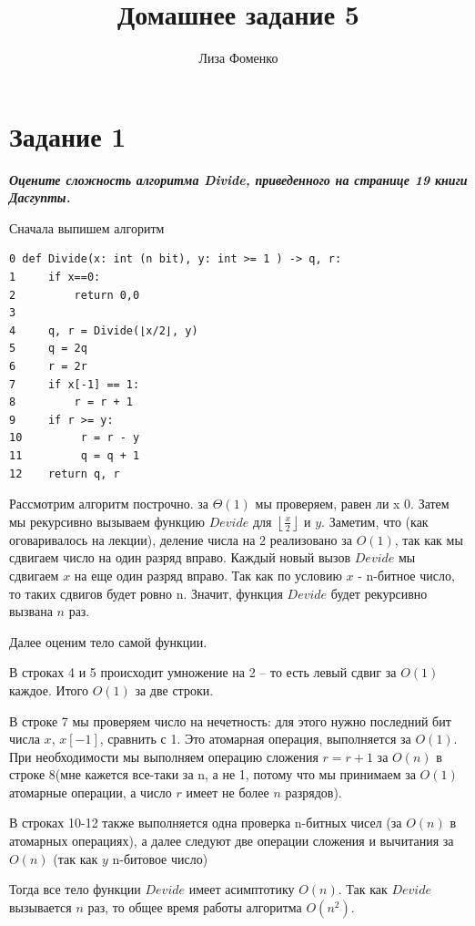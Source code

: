 \documentclass{article}
\title{Домашнее задание 5}
\author{Лиза Фоменко}
\date{}
\begin{document}
\maketitle



\section*{\textbf{Задание 1}} \textbf{\textit{Оцените сложность алгоритма Divide, приведенного на странице 19 книги Дасгупты.}}

Сначала выпишем алгоритм

\begin{verbatim}
0 def Divide(x: int (n bit), y: int >= 1 ) -> q, r:
1     if x==0: 
2         return 0,0
3 
4     q, r = Divide(⌊x/2⌋, y)
5     q = 2q
6     r = 2r
7     if x[-1] == 1: 
8         r = r + 1
9     if r >= y: 
10         r = r - y
11         q = q + 1
12    return q, r
\end{verbatim}

Рассмотрим алгоритм построчно. за $\Theta(1)$ мы проверяем, равен ли x 0. 
Затем мы рекурсивно вызываем функцию $Devide$ для $\left \lfloor{\frac{x}{2}}\right \rfloor $ и $y$. Заметим, что (как оговаривалось на лекции), деление числа на 2 реализовано за $O(1)$, так как мы сдвигаем число на один разряд вправо. Каждый новый вызов $Devide$ мы сдвигаем $x$ на еще один разряд вправо. Так как по условию $x$ - n-битное число, то таких сдвигов будет ровно n. Значит, функция $Devide$ будет рекурсивно вызвана $n$ раз.

Далее оценим тело самой функции.

В строках 4 и 5 происходит умножение на 2 -- то есть левый сдвиг за $O(1)$ каждое. Итого $O(1)$ за две строки.

В строке 7 мы проверяем число на нечетность: для этого нужно последний бит числа $x$, $x[-1]$, сравнить с 1. Это атомарная операция, выполняется за $O(1)$. При необходимости мы выполняем операцию сложения $r = r+1$ за $O(n)$ в строке 8(мне кажется все-таки за n, а не 1, потому что мы принимаем за $O(1)$ атомарные операции, а число $r$ имеет не более $n$ разрядов).

В строках 10-12 также выполняется одна проверка n-битных чисел (за $O(n)$ в атомарных операциях), а далее следуют две операции сложения и вычитания за $O(n)$ (так как $y$ n-битовое число) 

Тогда все тело функции $Devide$ имеет асимптотику $O(n)$. Так как $Devide$ вызывается $n$ раз, то общее время работы алгоритма $O(n^2)$.
\end{document}
